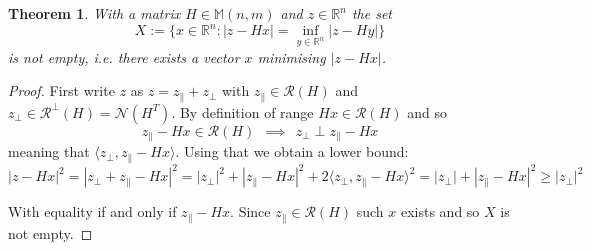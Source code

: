 \documentclass[a4paper]{article}
\theoremstyle{break}
\newtheorem{theorem}{Theorem}[section]
\newcommand{\R}{\mathbb{R}}
\newcommand{\Nu}{\mathcal{N}}
\newcommand{\Ra}{\mathcal{R}}
\newcommand{\Mat}[2]{\mathbb{M}(#1, #2)}
\newcommand{\pll}{\parallel}
\begin{document}
\begin{theorem}\label{thm:regression_existence}
With a matrix $H \in \Mat{n}{m}$ and $z \in \R^n$ the set
\begin{equation*}
    X := \{ x \in \R^n : | z - H x | = \inf\limits_{y \in \R^n} | z - H y | \}
\end{equation*}
        is not empty, i.e. there exists a vector $x$ minimising $| z - H x |$.
\end{theorem}
\begin{proof} %
    First write $z$ as $z = z_\pll + z_\perp$ with $z_\pll \in \Ra(H)$ and $z_\perp \in \Ra^\perp(H) = \Nu(H^T)$.
    By definition of range $H x \in \Ra(H)$ and so
    $$ z_\pll - H x \in \Ra(H) ~~ \implies ~~ z_\perp \perp z_\pll - H x $$
    meaning that $\langle z_\perp, z_\pll - H x \rangle$. Using that we obtain a lower bound:
    \begin{equation}\label{eq:upper_bound}
    | z - H x |^2 = | z_\perp + z_\pll - H x |^2 =
    | z_\perp |^2 + | z_\pll - H x |^2 + 2 \langle z_\perp, z_\pll - H x \rangle^2 = 
    | z_\perp | + | z_\pll - H x |^2 \geq | z_\perp |^2
    \end{equation}
    
    With equality if and only if $ z_\pll - H x $. Since $ z_\pll \in \Ra(H)$ such $x$ exists and so $X$ is not empty.
\end{proof}
\end{document}
